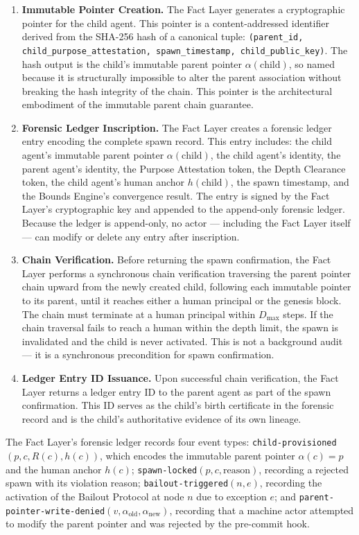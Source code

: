 \begin{enumerate}
    \item \textbf{Immutable Pointer Creation.} The Fact Layer generates a cryptographic pointer for the child agent. This pointer is a content-addressed identifier derived from the SHA-256 hash of a canonical tuple: \texttt{(parent\_id, child\_purpose\_attestation, spawn\_timestamp, child\_public\_key)}. The hash output is the child's immutable parent pointer $\alpha(\text{child})$, so named because it is structurally impossible to alter the parent association without breaking the hash integrity of the chain. This pointer is the architectural embodiment of the immutable parent chain guarantee.
    \item \textbf{Forensic Ledger Inscription.} The Fact Layer creates a forensic ledger entry encoding the complete spawn record. This entry includes: the child agent's immutable parent pointer $\alpha(\text{child})$, the child agent's identity, the parent agent's identity, the Purpose Attestation token, the Depth Clearance token, the child agent's human anchor $h(\text{child})$, the spawn timestamp, and the Bounds Engine's convergence result. The entry is signed by the Fact Layer's cryptographic key and appended to the append-only forensic ledger. Because the ledger is append-only, no actor — including the Fact Layer itself — can modify or delete any entry after inscription.
    \item \textbf{Chain Verification.} Before returning the spawn confirmation, the Fact Layer performs a synchronous chain verification traversing the parent pointer chain upward from the newly created child, following each immutable pointer to its parent, until it reaches either a human principal or the genesis block. The chain must terminate at a human principal within $D_{\max}$ steps. If the chain traversal fails to reach a human within the depth limit, the spawn is invalidated and the child is never activated. This is not a background audit — it is a synchronous precondition for spawn confirmation.
    \item \textbf{Ledger Entry ID Issuance.} Upon successful chain verification, the Fact Layer returns a ledger entry ID to the parent agent as part of the spawn confirmation. This ID serves as the child's birth certificate in the forensic record and is the child's authoritative evidence of its own lineage.
\end{enumerate}

The Fact Layer's forensic ledger records four event types: \texttt{child-provisioned}$(p, c, R(c), h(c))$, which encodes the immutable parent pointer $\alpha(c) = p$ and the human anchor $h(c)$; \texttt{spawn-locked}$(p, c, \text{reason})$, recording a rejected spawn with its violation reason; \texttt{bailout-triggered}$(n, e)$, recording the activation of the Bailout Protocol at node $n$ due to exception $e$; and \texttt{parent-pointer-write-denied}$(v, \alpha_{\text{old}}, \alpha_{\text{new}})$, recording that a machine actor attempted to modify the parent pointer and was rejected by the pre-commit hook.

